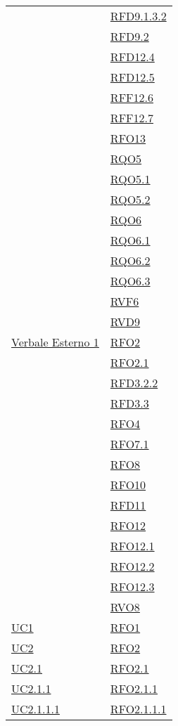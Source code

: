 \begin{longtable}{|>{\centering}m{5cm}|m{5cm}<{\centering}|}
& \hyperlink{RFD9.1.3.2}{RFD9.1.3.2}\\
& \hyperlink{RFD9.2}{RFD9.2}\\
& \hyperlink{RFD12.4}{RFD12.4}\\
& \hyperlink{RFD12.5}{RFD12.5}\\
& \hyperlink{RFF12.6}{RFF12.6}\\
& \hyperlink{RFF12.7}{RFF12.7}\\
& \hyperlink{RFO13}{RFO13}\\
& \hyperlink{RQO5}{RQO5}\\
& \hyperlink{RQO5.1}{RQO5.1}\\
& \hyperlink{RQO5.2}{RQO5.2}\\
& \hyperlink{RQO6}{RQO6}\\
& \hyperlink{RQO6.1}{RQO6.1}\\
& \hyperlink{RQO6.2}{RQO6.2}\\
& \hyperlink{RQO6.3}{RQO6.3}\\
& \hyperlink{RVF6}{RVF6}\\
& \hyperlink{RVD9}{RVD9}\\ \hline
\hyperlink{Verbale Esterno 1}{Verbale Esterno 1} & \hyperlink{RFO2}{RFO2}\\
& \hyperlink{RFO2.1}{RFO2.1}\\
& \hyperlink{RFD3.2.2}{RFD3.2.2}\\
& \hyperlink{RFD3.3}{RFD3.3}\\
& \hyperlink{RFO4}{RFO4}\\
& \hyperlink{RFO7.1}{RFO7.1}\\
& \hyperlink{RFO8}{RFO8}\\
& \hyperlink{RFO10}{RFO10}\\
& \hyperlink{RFD11}{RFD11}\\
& \hyperlink{RFO12}{RFO12}\\
& \hyperlink{RFO12.1}{RFO12.1}\\
& \hyperlink{RFO12.2}{RFO12.2}\\
& \hyperlink{RFO12.3}{RFO12.3}\\
& \hyperlink{RVO8}{RVO8}\\ \hline
\hyperref[UC1]{UC1} & \hyperlink{RFO1}{RFO1}\\ \hline
\hyperref[UC2]{UC2} & \hyperlink{RFO2}{RFO2}\\ \hline
\hyperref[UC2.1]{UC2.1} & \hyperlink{RFO2.1}{RFO2.1}\\ \hline
\hyperref[UC2.1.1]{UC2.1.1} & \hyperlink{RFO2.1.1}{RFO2.1.1}\\ \hline
\hyperref[UC2.1.1.1]{UC2.1.1.1} & \hyperlink{RFO2.1.1.1}{RFO2.1.1.1}\\ \hline

\end{longtable}
